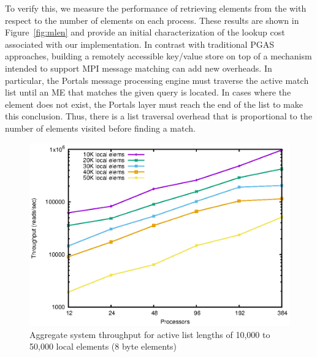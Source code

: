 To verify this, we measure the performance of retrieving elements from
the \pdht with respect to the number of elements on each process.
These results are shown in Figure~\ref{fig:mlen} and provide an
initial characterization of the lookup cost associated with our \pdht
implementation.  In contrast with traditional PGAS approaches,
building a remotely accessible key/value store on top of a mechanism
intended to support MPI message matching can add new overheads.  In
particular, the Portals message processing engine must traverse the
active match list until an ME that matches the given query is located.
In cases where the element does not exist, the Portals layer must
reach the end of the list to make this conclusion.  Thus, there is a
list traversal overhead that is proportional to the number of elements
visited before finding a match.

\begin{figure}
    \centering
    \includegraphics[width=.9\linewidth]{plots/throughput}
    \caption{Aggregate system throughput for active list lengths of 10,000 to 50,000 local elements (8 byte elements)}
    \label{fig:throughput}
\end{figure}

